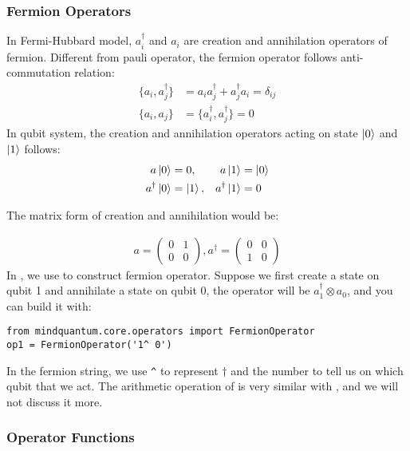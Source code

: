 \subsubsection{Fermion Operators}

In Fermi-Hubbard model, $a_i^\dagger$ and $a_i$ are creation and annihilation operators of fermion. Different from pauli operator, the fermion operator follows anti-commutation relation:
\begin{align*}
    \{a_i, a_j^\dagger\} & = a_ia_j^\dagger + a_j^\dagger a_i = \delta_{ij} \\
    \{a_i, a_j\}         & = \{a_i^\dagger, a_j^\dagger\}=0
\end{align*}
In qubit system, the creation and annihilation operators acting on state $\ket{0}$ and $\ket{1}$ follows:
\begin{align*}
    a\ket{0}          & =0,        & a\ket{1}          & =\ket{0} \\
    a^\dagger \ket{0} & = \ket{1}, & a^\dagger \ket{1} & =0
\end{align*}

The matrix form of creation and annihilation would be:

\begin{align*}
    a=\begin{pmatrix}
          0 & 1 \\
          0 & 0
      \end{pmatrix},
    a^\dagger=\begin{pmatrix}
                  0 & 0 \\
                  1 & 0
              \end{pmatrix}
\end{align*}
In \MindQuantum, we use \FermionOperator to construct fermion operator. Suppose we first create a state on qubit 1 and annihilate a state on qubit 0, the operator will be $a_1^\dagger\otimes a_0$, and you can build it with:
\begin{lstlisting}
from mindquantum.core.operators import FermionOperator
op1 = FermionOperator('1^ 0')
\end{lstlisting}
In the fermion string, we use \verb|^| to represent $\dagger$ and the number to tell us on which qubit that we act. The arithmetic operation of \FermionOperator is very similar with \QubitOperator, and we will not discuss it more.


\subsubsection{Operator Functions}

